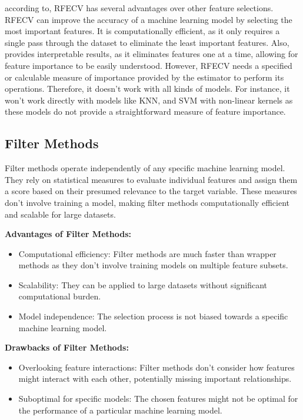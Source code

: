 \documentclass[12pt]{report}
\begin{document}
according to\cite{10.3389/fbioe.2020.00496}, RFECV has several advantages over
other feature selections. RFECV can improve the accuracy of a machine learning
model by selecting the most important features. It is computationally
efficient, as it only requires a single pass through the dataset to eliminate
the least important features. Also, provides interpretable results, as it
eliminates features one at a time, allowing for feature importance to be easily
understood. However, RFECV needs a specified or calculable measure of
importance provided by the estimator to perform its operations. Therefore, it
doesn't work with all kinds of models. For instance, it won't work directly
with models like KNN, and SVM with non-linear kernels as these models do not provide
a straightforward measure of feature importance.\newpage

\subsection*{Filter Methods}
Filter methods operate independently of any specific machine learning model.
They rely on statistical measures to evaluate individual features and assign
them a score based on their presumed relevance to the target
variable\cite{10.1016/j.eswa.2012.02.053}. These measures don't involve
training a model, making filter methods computationally efficient and scalable
for large datasets.

\textbf{Advantages of Filter Methods:}
\begin{itemize}
      \item Computational efficiency: Filter methods are much faster than wrapper methods
            as they don't involve training models on multiple feature subsets.
      \item Scalability: They can be applied to large datasets without significant
            computational burden.
      \item Model independence: The selection process is not biased towards a specific
            machine learning model.
\end{itemize}

\textbf{Drawbacks of Filter Methods:}
\begin{itemize}
      \item Overlooking feature interactions: Filter methods don't consider how features
            might interact with each other, potentially missing important relationships.
      \item Suboptimal for specific models: The chosen features might not be optimal for
            the performance of a particular machine learning model.
\end{itemize}
\end{document}
